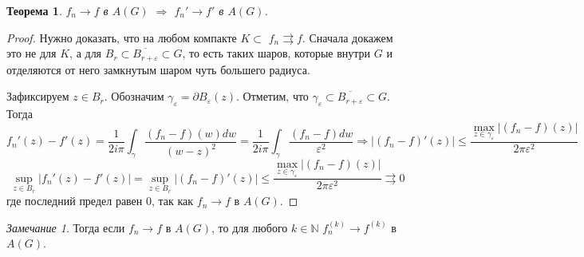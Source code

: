 \documentclass[12pt]{article}
\newcommand{\N}{\mathbb{N}}
\newcommand{\Ra}{\Rightarrow}
\newcounter{cnt}
\theoremstyle{thmnote}
\newtheorem{theorem}[cnt]{Теорема}
\theoremstyle{remark}
\newtheorem*{remark}{Замечание}
\theoremstyle{defnote}
\begin{document}
\begin{theorem}
    $f_n \to f$ в $A(G)$ $\Ra$ $f_n' \to f'$ в $A(G)$.
\end{theorem}
\begin{proof}
    Нужно доказать, что на любом компакте $K \subset$ $f_n \rightrightarrows f$. Сначала докажем это не для $K$, а для $B_r \subset \overline{B_{r + \varepsilon}} \subset G$, то есть таких шаров, которые внутри $G$ и отделяются от него замкнутым шаром чуть большего радиуса.

    Зафиксируем $z \in B_r$. Обозначим $\gamma_\varepsilon = \partial B_\varepsilon(z)$. Отметим, что $\gamma_\varepsilon \subset \overline{B_{r + \varepsilon}} \subset G$. Тогда
    \begin{equation*}
        f_n'(z) - f'(z) = \frac{1}{2 i \pi} \int_\gamma \frac{(f_n - f)(w) dw}{(w - z)^2} = \frac{1}{2 i \pi} \int_\gamma \frac{(f_n - f) dw}{\varepsilon^2} \Ra |(f_n - f)'(z)| \leq \frac{\max_{z \in \gamma_\varepsilon} |(f_n - f)(z)|}{2 \pi \varepsilon^2}
    \end{equation*}
    \begin{equation*}
        \sup_{z \in B_r} |f_n'(z) - f'(z)| = \sup_{z \in B_r} |(f_n - f)'(z)| \leq \frac{\max_{z \in \gamma_\varepsilon} |(f_n - f)(z)|}{2 \pi \varepsilon^2} \rightrightarrows 0
    \end{equation*}
    где последний предел равен 0, так как $f_n \to f$ в $A(G)$.
\end{proof}

\begin{remark}
    Тогда если $f_n \to f$ в $A(G)$, то для любого $k \in \N$ $f_n^{(k)} \to f^{(k)}$ в $A(G)$.
\end{remark}
\end{document}
